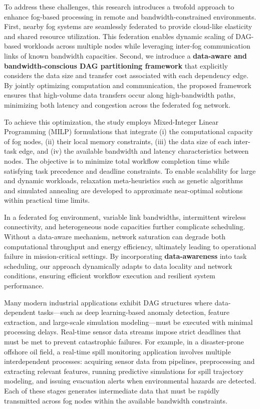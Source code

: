 \documentclass[conference]{IEEEtran}
\begin{document}
To address these challenges, this research introduces a twofold approach to enhance fog-based processing in remote and bandwidth-constrained environments. First, nearby fog systems are seamlessly federated to provide cloud-like elasticity and shared resource utilization. This federation enables dynamic scaling of DAG-based workloads across multiple nodes while leveraging inter-fog communication links of known bandwidth capacities. Second, we introduce a \textbf{data-aware and bandwidth-conscious DAG partitioning framework} that explicitly considers the data size and transfer cost associated with each dependency edge. By jointly optimizing computation and communication, the proposed framework ensures that high-volume data transfers occur along high-bandwidth paths, minimizing both latency and congestion across the federated fog network.

To achieve this optimization, the study employs Mixed-Integer Linear Programming (MILP) formulations that integrate (i) the computational capacity of fog nodes, (ii) their local memory constraints, (iii) the data size of each inter-task edge, and (iv) the available bandwidth and latency characteristics between nodes. The objective is to minimize total workflow completion time while satisfying task precedence and deadline constraints. To enable scalability for large and dynamic workloads, relaxation meta-heuristics such as genetic algorithms and simulated annealing are developed to approximate near-optimal solutions within practical time limits.

In a federated fog environment, variable link bandwidths, intermittent wireless connectivity, and heterogeneous node capacities further complicate scheduling. Without a data-aware mechanism, network saturation can degrade both computational throughput and energy efficiency, ultimately leading to operational failure in mission-critical settings. By incorporating \textbf{data-awareness} into task scheduling, our approach dynamically adapts to data locality and network conditions, ensuring efficient workflow execution and resilient system performance.

Many modern industrial applications exhibit DAG structures where data-dependent tasks—such as deep learning-based anomaly detection, feature extraction, and large-scale simulation modeling—must be executed with minimal processing delays. Real-time sensor data streams impose strict deadlines that must be met to prevent catastrophic failures. For example, in a disaster-prone offshore oil field, a real-time spill monitoring application involves multiple interdependent processes: acquiring sensor data from pipelines, preprocessing and extracting relevant features, running predictive simulations for spill trajectory modeling, and issuing evacuation alerts when environmental hazards are detected. Each of these stages generates intermediate data that must be rapidly transmitted across fog nodes within the available bandwidth constraints.
\end{document}
